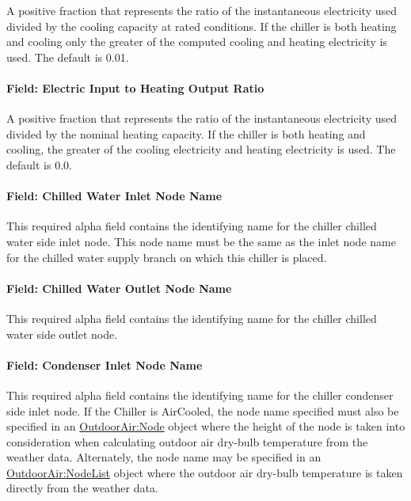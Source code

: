 A positive fraction that represents the ratio of the instantaneous electricity used divided by the cooling capacity at rated conditions. If the chiller is both heating and cooling only the greater of the computed cooling and heating electricity is used. The default is 0.01.

\paragraph{Field: Electric Input to Heating Output Ratio}\label{field-electric-input-to-heating-output-ratio-1}

A positive fraction that represents the ratio of the instantaneous electricity used divided by the nominal heating capacity. If the chiller is both heating and cooling, the greater of the cooling electricity and heating electricity is used. The default is 0.0.

\paragraph{Field: Chilled Water Inlet Node Name}\label{field-chilled-water-inlet-node-name-8}

This required alpha field contains the identifying name for the chiller chilled water side inlet node. This node name must be the same as the inlet node name for the chilled water supply branch on which this chiller is placed.

\paragraph{Field: Chilled Water Outlet Node Name}\label{field-chilled-water-outlet-node-name-9}

This required alpha field contains the identifying name for the chiller chilled water side outlet node.

\paragraph{Field: Condenser Inlet Node Name}\label{field-condenser-inlet-node-name-8}

This required alpha field contains the identifying name for the chiller condenser side inlet node. If the Chiller is AirCooled, the node name specified must also be specified in an \hyperref[outdoorairnode]{OutdoorAir:Node} object where the height of the node is taken into consideration when calculating outdoor air dry-bulb temperature from the weather data. Alternately, the node name may be specified in an \hyperref[outdoorairnodelist]{OutdoorAir:NodeList} object where the outdoor air dry-bulb temperature is taken directly from the weather data.

